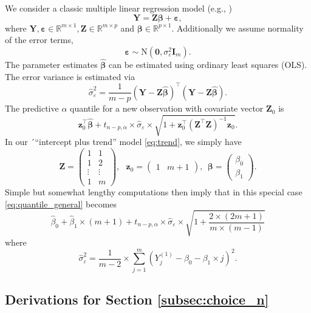 \documentclass[12pt]{article}
\begin{document}
We consider a classic multiple linear regression model (e.g., \citealt{Fahrmeir2013})
$$
\mathbf{Y} = \mathbf{Z}\boldsymbol{\beta} + \boldsymbol{\varepsilon},
$$
where $\mathbf{Y}, \boldsymbol{\varepsilon} \in \mathbb{R}^{m\times 1}, \mathbf{Z}\in \mathbb{R}^{m \times p}$ and $\boldsymbol{\beta} \in \mathbb{R}^{p \times 1}$. Additionally we assume normality of the error terms,
$$
\boldsymbol{\varepsilon} \sim \text{N}(\boldsymbol{0}, \sigma^2_\varepsilon \mathbf{I}_m).
$$
The parameter estimates $\hat{\boldsymbol{\beta}}$ can be estimated using ordinary least squares (OLS). The error variance is estimated via
$$
\hat{\sigma}^2_\varepsilon = \frac{1}{m - p} (\mathbf{Y} - \mathbf{Z}\hat{\boldsymbol{\beta}})^\top (\mathbf{Y} - \mathbf{Z}\hat{\boldsymbol{\beta}}).
$$
The predictive $\alpha$ quantile for a new observation with covariate vector $\mathbf{Z}_0$ is
\begin{equation}
\mathbf{z}_0^\top\hat{\boldsymbol{\beta}} + t_{n - p, \alpha} \times \hat{\sigma}_\varepsilon\times \sqrt{1 + \mathbf{z}_0^\top (\mathbf{Z}^\top\mathbf{Z})^{-1} \mathbf{z}_0}.\label{eq:quantile_general}
\end{equation}
In our ´``intercept plus trend'' model \eqref{eq:trend}, we simply have
$$
\mathbf{Z} = \left( \begin{array}{cc}
1 & 1\\
1 & 2\\
\vdots & \vdots\\
1 & m
\end{array}\right),\ \ \ \mathbf{z}_0 = \left( \begin{array}{cc}
1 & m + 1
\end{array}\right), \ \ 
\boldsymbol{\beta} = \left( \begin{array}{c}
\beta_0 \\ \beta_1
\end{array}\right).
$$
Simple but somewhat lengthy computations then imply that in this special case \eqref{eq:quantile_general} becomes
\begin{equation}
\hat{\beta}_0 + \hat{\beta}_1 \times (m + 1) + t_{n - p, \alpha} \times \hat{\sigma}_\varepsilon\times \sqrt{1 + \frac{2\times(2m + 1)}{m\times (m - 1)}}
\end{equation}
where
$$
\hat{\sigma}^2_\varepsilon = \frac{1}{m - 2} \times \sum_{j = 1}^m \left(Y^{(1)}_j - \beta_0 - \beta_1 \times j\right)^2.
$$

\subsection{Derivations for Section \ref{subsec:choice_n}}
\label{appendix:derivation_n}
\end{document}
